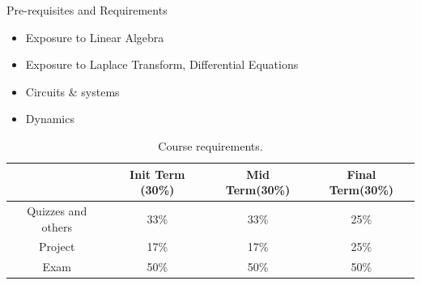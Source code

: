 \documentclass[10pt]{beamer}
\begin{document}
\begin{frame}[fragile]{Pre-requisites and Requirements}
    \begin{itemize}
        \item Exposure to Linear Algebra
        \item Exposure to Laplace Transform, Differential Equations
        \item Circuits \& systems
        \item Dynamics 
    \end{itemize}

    
    \begin{table}
    \begin{centering}
    \begin{tabular}{|c|c|c|c|}
    \hline 
     & Init Term (30\%) & Mid Term(30\%) & Final Term(30\%)\tabularnewline
    \hline 
    \hline 
    Quizzes and others & 33\% & 33\% & 25\%\tabularnewline
    \hline 
    Project & 17\% & 17\% & 25\%\tabularnewline
    \hline 
    Exam & 50\% & 50\% & 50\%\tabularnewline
    \hline 
    \end{tabular}
    \par\end{centering}
    \caption{Course requirements.}
    \end{table}

\end{frame}
\end{document}
